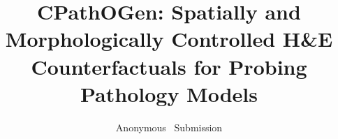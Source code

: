\documentclass[10pt,twocolumn,letterpaper]{article}
\title{CPathOGen: Spatially and Morphologically Controlled H\&E Counterfactuals for Probing Pathology Models}
\author{Anonymous \confName~\confYear Submission}
\begin{document}
\maketitle










{\small


}
\end{document}
